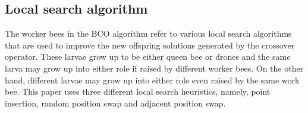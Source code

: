 \subsection{Local search algorithm}
The worker bees in the BCO algorithm refer to various local search algorithms that are used to improve the new offspring solutions generated by the crossover operator.
These larvae grow up to be either queen bee or drones and the same larva may grow up into either role if raised by different worker bees.
On the other hand, different larvae may grow up into either role even raised by the same work bee.
This paper uses three different local search heuristics, namely, point insertion, random position swap and adjacent position swap.





